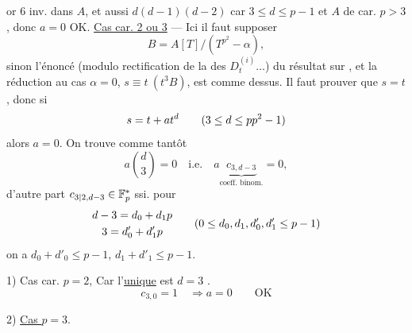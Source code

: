 or 6 inv. dans $A$, et aussi $d(d-1)(d-2)$ car $3\le d\le p-1$ et $A$ de car. $p>3$, donc $a=0$ OK.
\uline{Cas car. 2 ou 3} --- Ici il faut supposer
\[ B=A[T]/(T^{p^2}-\alpha), \]
sinon l'énoncé (modulo rectification de la  des $D_t^{(i)}\ldots$) du résultat sur , et la réduction au cas $\alpha=0$, $s\equiv t\ (t^3B)$, est comme dessus. Il faut prouver que $s=t$, donc si
\[s=t+at^d\qquad(3\leq d\leq{{p}}p^2-1)\]
alors $a=0$. On trouve comme tantôt
\[a\binom d3=0\quad\text{i.e.}\quad a\underbrace{c_{3,d-3}}_{\text{coeff. binom.}}=0,\]
d'autre part $c_{{3|2},d-3}\in\mathbb F_p^*$ ssi.  pour
\[
\begin{gathered}
d-3=d_0+d_1p\\
{3}=d'_0+d'_1p
\end{gathered}
\qquad(0\leq d_0,d_1,d'_0,d'_1\leq p-1)
\]
on a $d_0+d'_0\leq p-1$, $d_1+d'_1\leq p-1$.

1) Cas car. $p=2$, 
Car l'\uline{unique} est $d=3$ .
\[c_{3,0}=1\quad\Longrightarrow a=0\qquad\text{OK}\]

2) \uline{Cas $p=3$}. 


